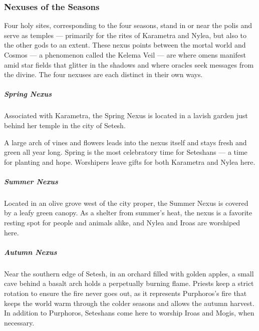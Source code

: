 
    \subsubsection{Nexuses of the Seasons}
        Four holy sites, corresponding to the four seasons, stand in or near the polis and serve as temples --- primarily for the rites of Karametra and Nylea, but also to the other gods to an extent.
        These nexus points between the mortal world and Cosmos --- a phenomenon called the Kelema Veil --- are where omens manifest amid star fields that glitter in the shadows and where oracles seek messages from the divine. The four nexuses are each distinct in their own ways.

        \subparagraph{Spring Nexus} Associated with Karametra, the Spring Nexus is located in a lavish garden just behind her temple in the city of Setesh.


        A large arch of vines and flowers leads into the nexus itself and stays fresh and green all year long.
        Spring is the most celebratory time for Seteshans --- a time for planting and hope.
        Worshipers leave gifts for both Karametra and Nylea here.

        \subparagraph{Summer Nexus} Located in an olive grove west of the city proper, the Summer Nexus is covered by a leafy green canopy.
        As a shelter from summer's heat, the nexus is a favorite resting spot for people and animals alike, and Nylea and Iroas are worshiped here.

        \subparagraph{Autumn Nexus} Near the southern edge of Setesh, in an orchard filled with golden apples, a small cave behind a basalt arch holds a perpetually burning flame.
        Priests keep a strict rotation to ensure the fire never goes out, as it represents Purphoros's fire that keeps the world warm through the colder seasons and allows the autumn harvest.
        In addition to Purphoros, Seteshans come here to worship Iroas and Mogis, when necessary.

